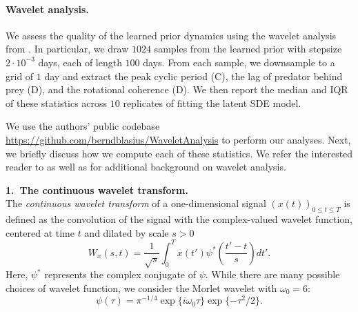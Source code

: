 \paragraph{Wavelet analysis.}
We assess the quality of the learned prior dynamics using the wavelet analysis from \citet{blasius2020long}.
In particular, we draw $1024$ samples from the learned prior with stepsize $2 \cdot 10^{-3}$ days, each of length $100$ days.
From each sample, we downsample to a grid of $1$ day and extract the peak cyclic period (C), the lag of predator behind prey (D), and the rotational coherence (D).
We then report the median and IQR of these statistics across $10$ replicates of fitting the latent SDE model. 

We use the authors' public codebase \url{https://github.com/berndblasius/WaveletAnalysis} to perform our analyses.
Next, we briefly discuss how we compute each of these statistics. 
We refer the interested reader to \citet[][supplementary methods]{blasius2020long} as well as \citet{torrence1998practical} for additional background on wavelet analysis.

\textbf{1.~The continuous wavelet transform.}\\
The \emph{continuous wavelet transform} of a one-dimensional signal $(x(t))_{0 \leq t \leq T}$ is defined as the convolution of the signal with the complex-valued wavelet function, centered at time $t$ and dilated by scale $s > 0$
\begin{equation}\label{app:eqn:wavelet}
    W_x(s, t) = \frac{1}{\sqrt{s}}\int_0^{T} x(t') \psi^*\left( \frac{t' - t}{s}\right)dt'.
\end{equation}
Here, $\psi^*$ represents the complex conjugate of $\psi$. 
While there are many possible choices of wavelet function, we consider the Morlet wavelet with $\omega_0 = 6$:
\begin{equation*}
    \psi(\tau) = \pi^{-1/4} \exp\{i \omega_0 \tau\} \exp\{-\tau^2/2\}.
\end{equation*}


